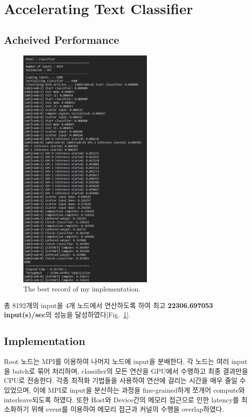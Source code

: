 \section{Accelerating Text Classifier}

\subsection{Acheived Performance}

\begin{figure}[h]
    \centering
    \includegraphics[width=0.6\textwidth]{imgs/best_record.png}
    \caption{The best record of my implementation.}
    \label{fig:best_record}
\end{figure}

총 8192개의 input을 4개 노드에서 연산하도록 하여 최고 
\textbf{22306.697053 input(s)/sec}의 성능을 달성하였다[Fig.~\ref{fig:best_record}].

\subsection{Implementation}
Root 노드는 MPI를 이용하여 나머지 노드에 input을 분배한다.
각 노드는 여러 input을 batch로 묶어 처리하며,
classifier의 모든 연산을 GPU에서 수행하고 최종 결과만을 CPU로 전송한다.
각종 최적화 기법들을 사용하여 연산에 걸리는 시간을 매우 줄일 수 있었으며,
이에 MPI로 input을 분산하는 과정을 fine-grained하게 쪼개어 compute와 interleave되도록 하였다.
또한 Host와 Device간의 메모리 접근으로 인한 latency를 최소화하기 위해
event를 이용하여 메모리 접근과 커널의 수행을 overlap하였다.

